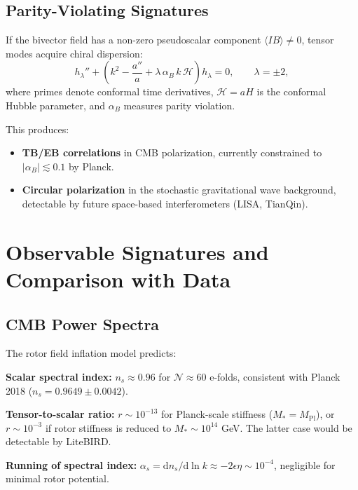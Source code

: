 \documentclass[11pt,a4paper]{article}
\numberwithin{equation}{section}
\theoremstyle{plain}
\theoremstyle{definition}
\theoremstyle{remark}
\newcommand{\dd}{\mathrm{d}}
\begin{document}
\subsection{Parity-Violating Signatures}

If the bivector field has a non-zero pseudoscalar component $\langle I B \rangle \neq 0$, tensor modes acquire chiral dispersion:
\begin{equation}
h_\lambda'' + \left(k^2 - \frac{a''}{a} + \lambda\,\alpha_B\,k\,\mathcal{H}\right)h_\lambda = 0,\qquad \lambda = \pm 2,
\label{eq:chiral-tensor}
\end{equation}
where primes denote conformal time derivatives, $\mathcal{H} = aH$ is the conformal Hubble parameter, and $\alpha_B$ measures parity violation.

This produces:
\begin{itemize}
  \item \textbf{TB/EB correlations} in CMB polarization, currently constrained to $|\alpha_B| \lesssim 0.1$ by Planck.
  \item \textbf{Circular polarization} in the stochastic gravitational wave background, detectable by future space-based interferometers (LISA, TianQin).
\end{itemize}

\section{Observable Signatures and Comparison with Data}
\label{sec:obs}

\subsection{CMB Power Spectra}

The rotor field inflation model predicts:

\textbf{Scalar spectral index:} $n_s \approx 0.96$ for $\mathcal{N} \approx 60$ e-folds, consistent with Planck 2018 ($n_s = 0.9649 \pm 0.0042$).

\textbf{Tensor-to-scalar ratio:} $r \sim 10^{-13}$ for Planck-scale stiffness ($M_* = M_{\mathrm{Pl}}$), or $r \sim 10^{-3}$ if rotor stiffness is reduced to $M_* \sim 10^{14}$ GeV. The latter case would be detectable by LiteBIRD.

\textbf{Running of spectral index:} $\alpha_s = \dd n_s/\dd \ln k \approx -2\epsilon\eta \sim 10^{-4}$, negligible for minimal rotor potential.
\end{document}
